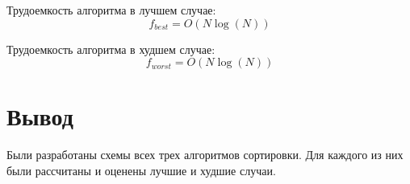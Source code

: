 Трудоемкость алгоритма в лучшем случае:
\begin{equation}
	\label{been_min}
	f_{best} = O(N\log(N))
\end{equation}

Трудоемкость алгоритма в худшем случае:
\begin{equation}
	\label{been_max}
	f_{worst} = O(N\log(N))
\end{equation}


\section*{Вывод}
Были разработаны схемы всех трех алгоритмов сортировки. Для каждого из них были рассчитаны и оценены лучшие и худшие случаи.



